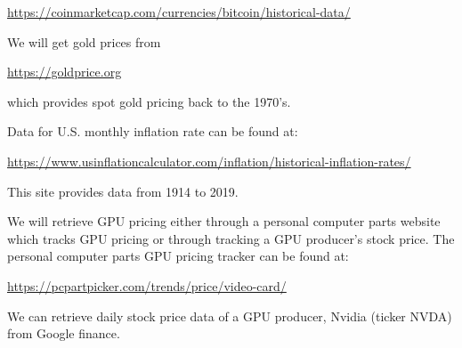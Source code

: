 \documentclass[12pt]{extarticle}
\begin{document}
\begin{center}
    \url{https://coinmarketcap.com/currencies/bitcoin/historical-data/}
\end{center}

We will get gold prices from

\begin{center}
    \url{https://goldprice.org}
\end{center}

which provides spot gold pricing back to the 1970's.

Data for U.S. monthly inflation rate can be found 
at:

\begin{center}
    \url{https://www.usinflationcalculator.com/inflation/historical-inflation-rates/}
\end{center}

\noindent This site provides data from 1914 to 2019.

We will retrieve GPU pricing either through a personal computer parts website which tracks GPU pricing or through tracking a GPU producer's stock price. The personal computer parts GPU pricing tracker can be found at:

\begin{center}
    \url{https://pcpartpicker.com/trends/price/video-card/}
\end{center}

We can retrieve daily stock price data of a GPU producer, Nvidia (ticker NVDA) from Google finance. 
\end{document}

